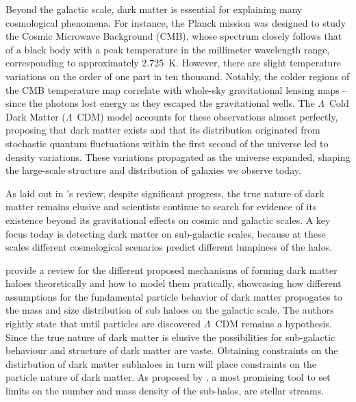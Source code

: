 \documentclass[draft]{aa}
\begin{document}
  Beyond the galactic scale, dark matter is essential for explaining many cosmological phenomena. For instance, the Planck mission \citep{2020A&A...641A...1P} was designed to study the Cosmic Microwave Background (CMB), whose spectrum closely follows that of a black body with a peak temperature in the millimeter wavelength range, corresponding to approximately 2.725~K. However, there are slight temperature variations on the order of one part in ten thousand. Notably, the colder regions of the CMB temperature map correlate with whole-sky gravitational lensing maps \citep{2020A&A...641A...8P}--since the photons lost energy as they escaped the gravitational wells. The $\Lambda$~Cold Dark Matter ($\Lambda$~CDM) model accounts for these observations almost perfectly, proposing that dark matter exists and that its distribution originated from stochastic quantum fluctuations within the first second of the universe led to density variations. These variations propagated as the universe expanded, shaping the large-scale structure and distribution of galaxies we observe today.

  As laid out in \citet{2021PrPNP.11903865A}'s review, despite significant progress, the true nature of dark matter remains elusive and scientists continue to search for evidence of its existence beyond its gravitational effects on cosmic and galactic scales. A key focus today is detecting dark matter on sub-galactic scales, because at these scales different cosmological scenarios predict different lumpiness of the halos.
    
  \citet{2019Galax...7...81Z} provide a review for the different proposed mechanisms of forming dark matter haloes theoretically and how to model them pratically, showcasing how different assumptions for the fundamental particle behavior of dark matter propogates to the mass and size distribution of sub haloes on the galactic scale. The authors rightly state that until particles are discovered $\Lambda$~CDM remains a hypothesis. Since the true nature of dark matter is elusive the possibilities for sub-galactic behaviour and structure of dark matter are vaste. Obtaining constraints on the distirbution of dark matter subhaloes in turn will place constraints on the particle nature of dark matter. As proposed by \citet{2012ApJ...748...20C}, a most promising tool to set limits on the number and mass density of the sub-halos, are stellar streams. 
\end{document}
